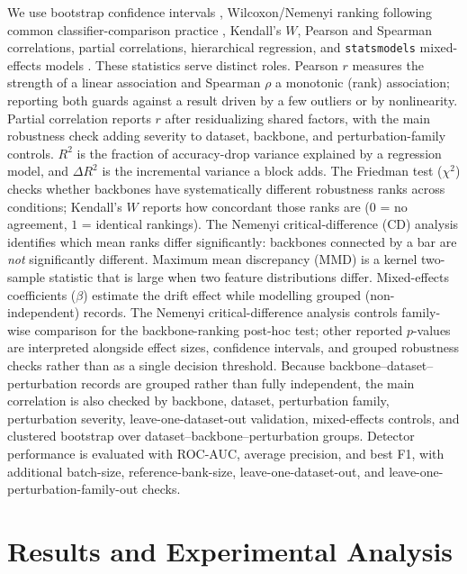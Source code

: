 \documentclass[a4paper,fleqn]{els-cas-templates/cas-sc}
\begin{document}
We use bootstrap confidence intervals \citep{efron1979bootstrap}, Wilcoxon/Nemenyi ranking following common classifier-comparison practice \citep{demsar2006statistical}, Kendall's $W$, Pearson and Spearman correlations, partial correlations, hierarchical regression, and \texttt{statsmodels} mixed-effects models \citep{laird1982random,seabold2010statsmodels}. These statistics serve distinct roles. Pearson $r$ measures the strength of a linear association and Spearman $\rho$ a monotonic (rank) association; reporting both guards against a result driven by a few outliers or by nonlinearity. Partial correlation reports $r$ after residualizing shared factors, with the main robustness check adding severity to dataset, backbone, and perturbation-family controls. $R^2$ is the fraction of accuracy-drop variance explained by a regression model, and $\Delta R^2$ is the incremental variance a block adds. The Friedman test ($\chi^2$) checks whether backbones have systematically different robustness ranks across conditions; Kendall's $W$ reports how concordant those ranks are ($0$ = no agreement, $1$ = identical rankings). The Nemenyi critical-difference (CD) analysis identifies which mean ranks differ significantly: backbones connected by a bar are \emph{not} significantly different. Maximum mean discrepancy (MMD) is a kernel two-sample statistic that is large when two feature distributions differ. Mixed-effects coefficients ($\beta$) estimate the drift effect while modelling grouped (non-independent) records. The Nemenyi critical-difference analysis controls family-wise comparison for the backbone-ranking post-hoc test; other reported $p$-values are interpreted alongside effect sizes, confidence intervals, and grouped robustness checks rather than as a single decision threshold. Because backbone--dataset--perturbation records are grouped rather than fully independent, the main correlation is also checked by backbone, dataset, perturbation family, perturbation severity, leave-one-dataset-out validation, mixed-effects controls, and clustered bootstrap over dataset--backbone--perturbation groups. Detector performance is evaluated with ROC-AUC, average precision, and best F1, with additional batch-size, reference-bank-size, leave-one-dataset-out, and leave-one-perturbation-family-out checks.

\section{Results and Experimental Analysis}
\end{document}
